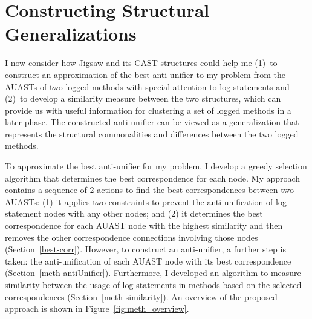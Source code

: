 \chapter{Constructing Structural Generalizations} \label{ch4} \label{methodology}

I now consider how Jigsaw and its CAST structures could help me (1)~to construct an approximation of the best anti-unifier to my problem from the AUASTs of two logged methods with special attention to log statements and (2)~to develop a similarity measure between the two structures, which can provide us with useful information for clustering a set of logged methods in a later phase. The constructed anti-unifier can be viewed as a generalization that represents the structural commonalities and differences between the two logged methods.




To approximate the best anti-unifier for my problem, I develop a greedy selection algorithm that determines the best correspondence for each node. My approach contains a sequence of 2 actions to find the best correspondences between two AUASTs: (1) it applies two constraints to prevent the anti-unification of log statement nodes with any other nodes; and (2) it determines the best correspondence for each AUAST node with the highest similarity and then removes the other correspondence connections involving those nodes (Section~\ref{best-corr}). However, to construct an anti-unifier, a further step is taken: the anti-unification of each AUAST node with its best correspondence (Section~\ref{meth-antiUnifier}). Furthermore, I developed an algorithm to measure similarity between the usage of log statements in methods based on the selected correspondences (Section~\ref{meth-similarity}). An overview of the proposed approach is shown in Figure~\ref{fig:meth_overview}.





